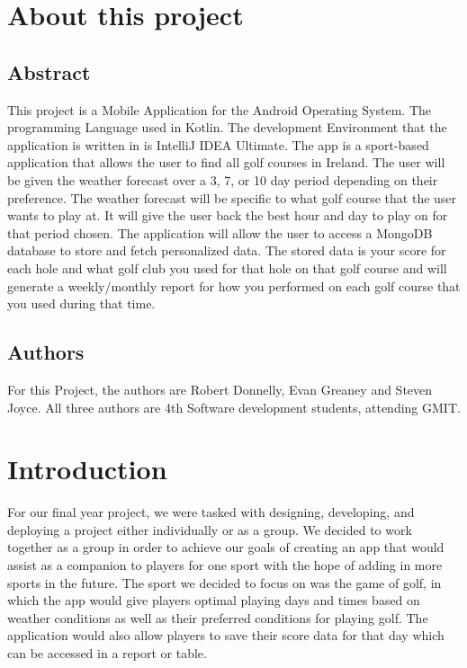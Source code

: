 \chapter{About this project}
\section{Abstract}
This project is a Mobile Application for the Android Operating System. The programming Language used in Kotlin. The development Environment that the application is written in is IntelliJ IDEA Ultimate.\newline
The app is a sport-based application that allows the user to find all golf courses in Ireland. The user will be given the weather forecast over a 3, 7, or 10 day period depending on their preference. The weather forecast will be specific to what golf course that the user wants to play at. It will give the user back the best hour and day to play on for that period chosen.\newline
The application will allow the user to access a MongoDB database to store and fetch personalized data. The stored data is your score for each hole and what golf club you used for that hole on that golf course and will generate a weekly/monthly report for how you performed on each golf course that you used during that time.\newline
\section{Authors}
For this Project, the authors are Robert Donnelly, Evan Greaney and Steven Joyce. All three authors are 4th Software development students, attending GMIT.
\chapter{Introduction}
For our final year project, we were tasked with designing, developing, and deploying a project either individually or as a group. We decided to work together as a group in order to achieve our goals of creating an app that would assist as a companion to players for one sport with the hope of adding in more sports in the future. The sport we decided to focus on was the game of golf, in which the app would give players optimal playing days and times based on weather conditions as well as their preferred conditions for playing golf. The application would also allow players to save their score data for that day which can be accessed in a report or table.

